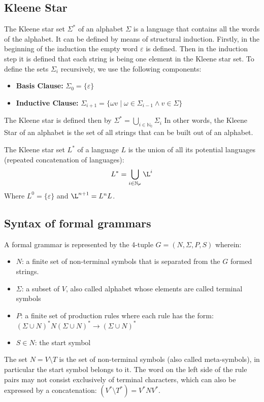 \subsection{Kleene Star}
The Kleene star set $\Sigma^*$ of an alphabet $\Sigma$ is a language that contains all the words of the alphabet. It can be defined by means of structural induction. 
Firstly, in the beginning of the induction the empty word $\varepsilon$ is defined. Then in the induction step it is defined that each string is being one element in the Kleene star set.
To define the sets $\Sigma_i$ recursively, we use the following components:
\begin{itemize}
\item \textbf{Basis Clause: }$\Sigma_0 = \{\varepsilon\}$ 
\item \textbf{Inductive Clause: }$\Sigma_{i+1} = \{\omega v \mid \omega\in\Sigma_{i-1}\wedge v\in\Sigma\}$
\end{itemize}
The Kleene star is defined then by $\Sigma^* = \bigcup\limits_{i\in\mathbb{N_0}} \Sigma_{i}$
In other words, the Kleene Star of an alphabet is the set of all strings that can be built out of an alphabet.

The Kleene star set $L^*$ of a language $L$ is the union of all its potential languages (repeated concatenation of languages):
$$L^* = \bigcup\limits_{i\in\mathbb{N_0}} \L^{i}$$
Where $L^0 = \{\varepsilon\}$ and $\L^{n+1} = L^nL$. 
\subsection{Syntax of formal grammars}
A formal grammar is represented by the 4-tuple $G=(N,\Sigma,P,S)$ wherein:
\begin{itemize}
\item $N$: a finite set of non-terminal symbols that is separated from the $G$ formed strings.
\item $\Sigma$: a subset of $V$, also called alphabet whose elements are called terminal symbols 
\item $P$: a finite set of production rules where each rule has the form: $(\Sigma \cup N)^{*}N(\Sigma \cup N)^{*}\rightarrow (\Sigma \cup N)^{*}$
\item $S \in N$: the start symbol
\end{itemize}
The set $N = V \setminus T$ is the set of non-terminal symbols (also called meta-symbols), in particular the start symbol belongs to it. The word on the left side of the rule pairs may not consist exclusively of terminal characters, which can also be expressed by a concatenation: $(V^* \setminus T^*) = V^*NV^*$.
